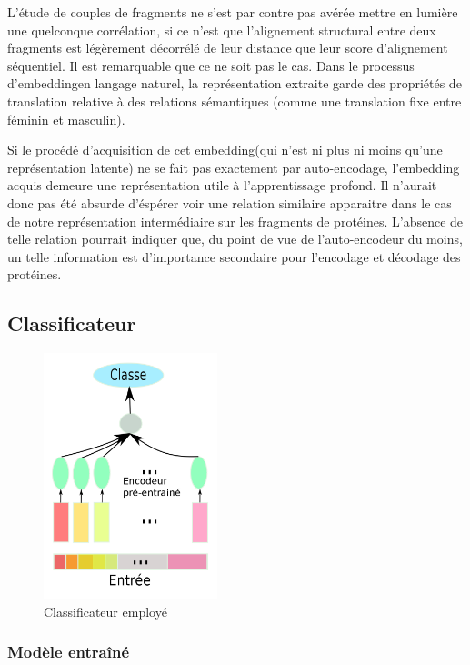 \documentclass[a4paper, 11pt, onecolumn]{article}
\begin{document}
L'étude de couples de fragments ne s'est par contre pas avérée mettre en lumière
une quelconque corrélation, si ce n'est que l'alignement structural entre deux
fragments est légèrement décorrélé de leur distance que leur score d'alignement
séquentiel. Il est remarquable que ce ne soit pas le cas. Dans le processus \og
d'embedding\fg en langage naturel, la représentation extraite garde des
propriétés de translation relative à des relations sémantiques (comme une
translation fixe entre féminin et masculin). 

Si le procédé d'acquisition de cet
\og embedding\fg (qui n'est ni plus ni moins qu'une représentation latente) ne
se fait pas exactement par auto-encodage, l'embedding acquis demeure une
représentation utile à l'apprentissage profond.  Il n'aurait donc pas été
absurde d'éspérer voir une relation similaire apparaitre dans le cas de notre
représentation intermédiaire sur les fragments de protéines. L'absence de telle
relation pourrait indiquer que, du point de vue de l'auto-encodeur du moins, un
telle information est d'importance secondaire pour l'encodage et décodage des protéines.

\subsection{Classificateur}

\begin{figure}
  \includegraphics[width=0.45\textwidth]{Class}
  \caption{Classificateur employé}
\end{figure}

\subsubsection{Modèle entraîné}
\end{document}
